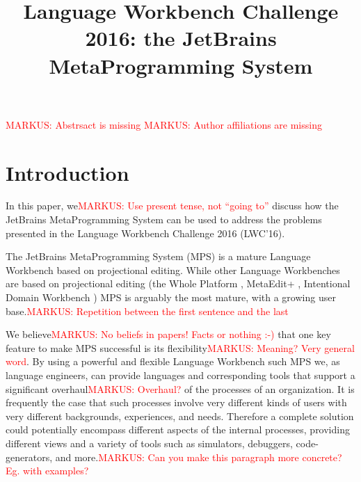 \documentclass[preprint,numbers,10pt]{sigplanconf}
\newcommand\markus[1]{\textcolor{red}{MARKUS: {#1}}}
\begin{document}
\title{Language Workbench Challenge 2016: the JetBrains MetaProgramming System}


\maketitle

%
%

\markus{Abstrsact is missing}
\markus{Author affiliations are missing}


\section{Introduction}



In this paper, we\markus{Use present tense, not ``going to''} discuss how the
JetBrains MetaProgramming System can be used to address the problems presented in the Language Workbench
Challenge 2016 (LWC'16).

The JetBrains MetaProgramming System (MPS) is a mature Language Workbench based
on projectional editing. While other Language Workbenches are based on
projectional editing (the Whole Platform \cite{solmi2005whole}, MetaEdit+
\cite{Tolvanen2006}, Intentional Domain Workbench \cite{Simonyi2006}) MPS is
arguably the most mature, with a growing user base.\markus{Repetition between
the first sentence and the last}

We believe\markus{No beliefs in papers! Facts or nothing :-)} that one key
feature to make MPS successful is its flexibility\markus{Meaning? Very general
word}.
By using a powerful and flexible Language Workbench such MPS we, as language
engineers, can provide languages and corresponding tools that support a
significant overhaul\markus{Overhaul?} of the processes of an organization. It
is frequently the case that such processes involve very different kinds of users with very
different backgrounds, experiences, and needs. Therefore a complete solution
could potentially encompass different aspects of the internal processes,
providing different views and a variety of tools such as simulators, debuggers,
code-generators, and more.\markus{Can you make this paragraph more concrete?
Eg. with examples?}
\end{document}
